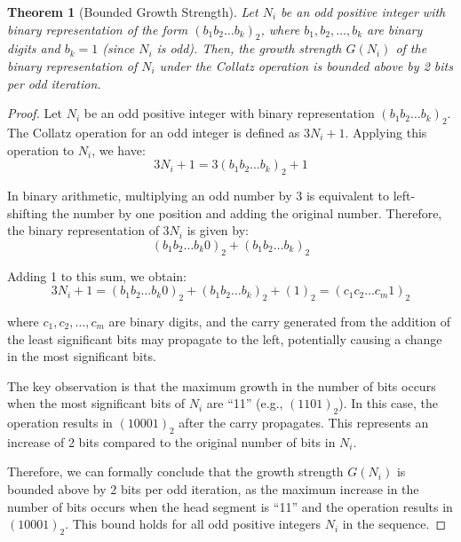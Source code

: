 \documentclass{article}
\newtheorem{theorem}{Theorem}
\begin{document}
\begin{theorem}[Bounded Growth Strength]
Let $N_i$ be an odd positive integer with binary representation of the form $(b_1 b_2 \ldots b_k)_2$, where $b_1, b_2, \ldots, b_k$ are binary digits and $b_k = 1$ (since $N_i$ is odd). Then, the growth strength $G(N_i)$ of the binary representation of $N_i$ under the Collatz operation is bounded above by 2 bits per odd iteration.
\end{theorem}

\begin{proof}
Let $N_i$ be an odd positive integer with binary representation $(b_1 b_2 \ldots b_k)_2$. The Collatz operation for an odd integer is defined as $3N_i + 1$. Applying this operation to $N_i$, we have:
\[ 3N_i + 1 = 3(b_1 b_2 \ldots b_k)_2 + 1 \]

In binary arithmetic, multiplying an odd number by 3 is equivalent to left-shifting the number by one position and adding the original number. Therefore, the binary representation of $3N_i$ is given by:
\[ (b_1 b_2 \ldots b_k 0)_2 + (b_1 b_2 \ldots b_k)_2 \]

Adding 1 to this sum, we obtain:
\[ 3N_i + 1 = (b_1 b_2 \ldots b_k 0)_2 + (b_1 b_2 \ldots b_k)_2 + (1)_2 = (c_1 c_2 \ldots c_m 1)_2 \]

where $c_1, c_2, \ldots, c_m$ are binary digits, and the carry generated from the addition of the least significant bits may propagate to the left, potentially causing a change in the most significant bits.

The key observation is that the maximum growth in the number of bits occurs when the most significant bits of $N_i$ are ``11'' (e.g., $(1101)_2$). In this case, the operation results in $(10001)_2$ after the carry propagates. This represents an increase of 2 bits compared to the original number of bits in $N_i$.

Therefore, we can formally conclude that the growth strength $G(N_i)$ is bounded above by 2 bits per odd iteration, as the maximum increase in the number of bits occurs when the head segment is ``11'' and the operation results in $(10001)_2$. This bound holds for all odd positive integers $N_i$ in the sequence.
\end{proof}
\end{document}
